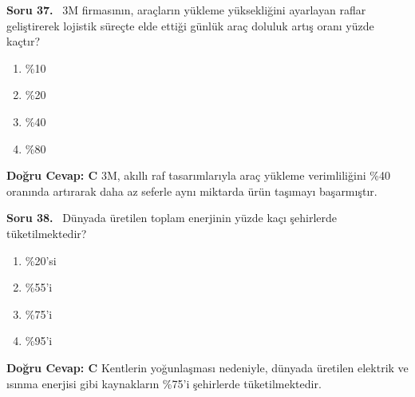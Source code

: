 \documentclass[11pt,a4paper,openany]{book}
\begin{document}
\needspace{5cm}
\vspace{8pt}
\noindent\textbf{\large\sffamily Soru 37.} \ 3M firmasının, araçların yükleme yüksekliğini ayarlayan raflar geliştirerek lojistik süreçte elde ettiği günlük araç doluluk artış oranı yüzde kaçtır?
\begin{enumerate}[label=\Alph*), leftmargin=25pt, topsep=4pt, itemsep=2pt]
    \item \%10
    \item \%20
    \item \%40
    \item \%80
\end{enumerate}
\vspace{4pt}
\begin{tcolorbox}[title=Cevap ve Açıklama, colback=gray!3!white, colframe=primarycolor!90!black, arc=2mm, fonttitle=\bfseries\sffamily, top=6pt, bottom=6pt]
    \textbf{Doğru Cevap: C}
    \vspace{2pt}
    3M, akıllı raf tasarımlarıyla araç yükleme verimliliğini \%40 oranında artırarak daha az seferle aynı miktarda ürün taşımayı başarmıştır.
\end{tcolorbox}
\vspace{10pt}

\needspace{5cm}
\vspace{8pt}
\noindent\textbf{\large\sffamily Soru 38.} \ Dünyada üretilen toplam enerjinin yüzde kaçı şehirlerde tüketilmektedir?
\begin{enumerate}[label=\Alph*), leftmargin=25pt, topsep=4pt, itemsep=2pt]
    \item \%20'si
    \item \%55'i
    \item \%75'i
    \item \%95'i
\end{enumerate}
\vspace{4pt}
\begin{tcolorbox}[title=Cevap ve Açıklama, colback=gray!3!white, colframe=primarycolor!90!black, arc=2mm, fonttitle=\bfseries\sffamily, top=6pt, bottom=6pt]
    \textbf{Doğru Cevap: C}
    \vspace{2pt}
    Kentlerin yoğunlaşması nedeniyle, dünyada üretilen elektrik ve ısınma enerjisi gibi kaynakların \%75'i şehirlerde tüketilmektedir.
\end{tcolorbox}
\vspace{10pt}
\end{document}

